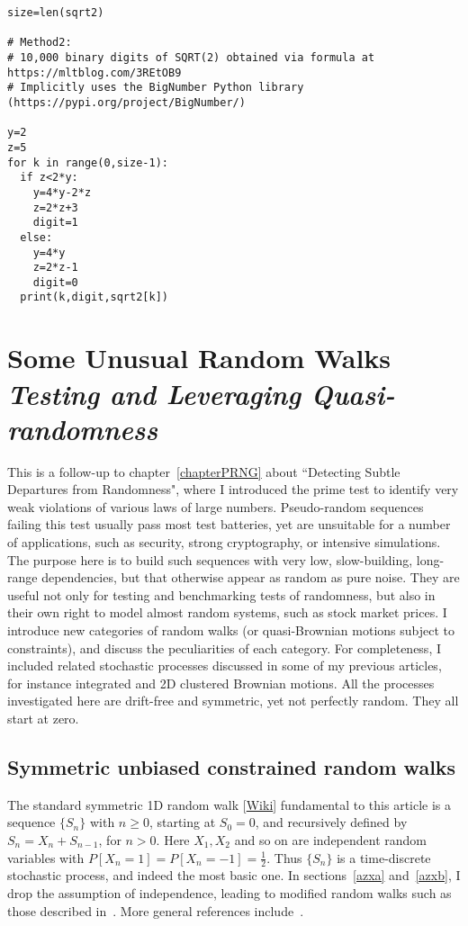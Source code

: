 \documentclass[oneside,10pt]{book}
\newcommand\Chapter[2]{
  \chapter[#1]{#1\\[2ex]\Large\itshape#2}
}
\begin{document}
\begin{lstlisting}
size=len(sqrt2)

# Method2:
# 10,000 binary digits of SQRT(2) obtained via formula at https://mltblog.com/3REtOB9
# Implicitly uses the BigNumber Python library (https://pypi.org/project/BigNumber/)

y=2
z=5
for k in range(0,size-1):
  if z<2*y:
    y=4*y-2*z
    z=2*z+3
    digit=1
  else:
    y=4*y
    z=2*z-1
    digit=0
  print(k,digit,sqrt2[k])
\end{lstlisting}


\Chapter{Some Unusual Random Walks}{Testing and Leveraging Quasi-randomness}

This is a follow-up to chapter~\ref{chapterPRNG} about ``Detecting Subtle Departures from Randomness", where I introduced the prime test to identify very weak violations of
 various laws of large numbers. Pseudo-random sequences failing this test usually pass most test batteries, yet are unsuitable for a number of applications, such as security, strong cryptography, or intensive simulations. The purpose here is to build such sequences with very low, slow-building, long-range dependencies, but that otherwise appear as random as pure noise. They are useful not only for testing and benchmarking tests of randomness, but also in their own right to model almost random systems, such as stock market prices. I introduce new categories of random walks (or quasi-Brownian motions subject to constraints),  and discuss the peculiarities of each category. For completeness, I included related stochastic processes discussed in
 some of my previous articles, for instance integrated and 2D clustered Brownian motions. All the processes investigated here
 are drift-free and symmetric, yet not perfectly random. They all start at zero.


\hypersetup{linkcolor=red}


\section{Symmetric unbiased constrained random walks}\label{pivizintrou}

The standard symmetric 1D \textcolor{index}{random walk} [\href{https://en.wikipedia.org/wiki/Random_walk}{Wiki}] fundamental to this article is a sequence $\{S_n\}$ with $n\geq 0$, starting at $S_0=0$, and recursively defined by
$S_{n}=X_{n}+S_{n-1}$, for $n>0$.  Here $X_1,X_2$ and so on are independent random variables with $P[X_n=1]=P[X_n=-1]=\frac{1}{2}$.
 Thus $\{S_n\}$ is a time-discrete stochastic process, and indeed the most basic one. In sections~\ref{azxa} and~\ref{azxb}, I drop the assumption
 of independence, leading to modified random walks such as those described in~\cite{nkrn2018,lanwu2012}.
More general references include~\cite{gtm2021,peresbrown}.
\end{document}

